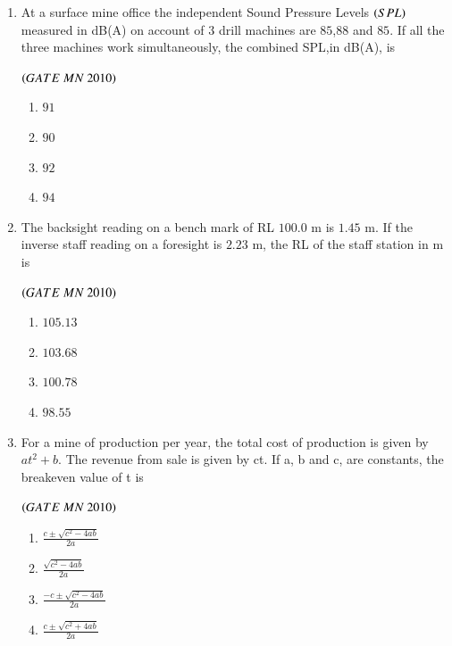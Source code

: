 \documentclass{article}
\begin{document}
\begin{enumerate}[label=Q.\arabic*., itemsep=1em, leftmargin=0pt, itemindent=*, labelsep=0.5em]
\begin{enumerate}[label=(\Alph*), leftmargin=4em, align=left]
\end{enumerate}
\item At a surface mine office the independent Sound Pressure Levels $\left(SPL\right)$ measured in dB(A) on
account of $3$ drill machines are $85$,$88$ and $85$. If all the three machines work simultaneously, the
combined SPL,in dB(A), is
\\
\begin{flushright}
\hfill$\left(GATE\ MN\ 2010\right)$
\end{flushright}
\begin{multicols}{4}
\begin{enumerate}[label=(\Alph*), leftmargin=4em, align=left]
\item $91$
\item $90$ 
\item $92$
\item $94$
\end{enumerate}
\end{multicols}
\bigskip
\item The backsight reading on a bench mark of RL $100.0$ m is $1.45$ m. If the inverse staff reading on a
foresight is $2.23$ m, the RL of the staff station in m is
\\
\begin{flushright}
\hfill$\left(GATE\ MN\ 2010\right)$
\end{flushright}
\begin{multicols}{4}
\begin{enumerate}[label=(\Alph*), leftmargin=4em, align=left]
\item $105.13$
\item $103.68$ 
\item $100.78$
\item $98.55$
\end{enumerate}
\end{multicols}
\bigskip
\item For a mine of production per year, the total cost of production is given by $at^2 + b$. The revenue
from sale is given by ct. If a, b and c, are constants, the breakeven value of t is
\\
\begin{flushright}
\hfill$\left(GATE\ MN\ 2010\right)$
\end{flushright}
  \begin{multicols}{2}
  \begin{enumerate}[label=(\Alph*),leftmargin=4em]
    \item $\displaystyle \frac{c \pm \sqrt{c^2 - 4ab}}{2a}$
    \item $\displaystyle \frac{\sqrt{c^2 - 4ab}}{2a}$
    \item $\displaystyle \frac{-c \pm \sqrt{c^2 - 4ab}}{2a}$
    \item $\displaystyle \frac{c \pm \sqrt{c^2 + 4ab}}{2a}$
    \end{enumerate}
  \end{multicols}
  

\end{enumerate}
\end{document}
